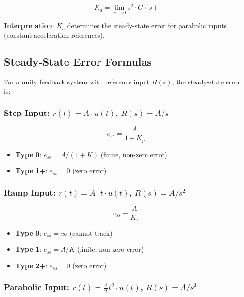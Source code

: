 \begin{equation}
    K_a = \lim_{s \to 0} s^2 \cdot G(s)
\end{equation}

\textbf{Interpretation}: $K_a$ determines the steady-state error for parabolic inputs (constant acceleration references).

\subsection{Steady-State Error Formulas}

For a unity feedback system with reference input $R(s)$, the steady-state error is:

\subsubsection{Step Input: $r(t) = A \cdot u(t)$, $R(s) = A/s$}

\begin{equation}
    \boxed{e_{ss} = \frac{A}{1 + K_p}}
\end{equation}

\begin{itemize}
    \item \textbf{Type 0}: $e_{ss} = A/(1 + K)$ (finite, non-zero error)
    \item \textbf{Type 1+}: $e_{ss} = 0$ (zero error)
\end{itemize}

\subsubsection{Ramp Input: $r(t) = A \cdot t \cdot u(t)$, $R(s) = A/s^2$}

\begin{equation}
    \boxed{e_{ss} = \frac{A}{K_v}}
\end{equation}

\begin{itemize}
    \item \textbf{Type 0}: $e_{ss} = \infty$ (cannot track)
    \item \textbf{Type 1}: $e_{ss} = A/K$ (finite, non-zero error)
    \item \textbf{Type 2+}: $e_{ss} = 0$ (zero error)
\end{itemize}

\subsubsection{Parabolic Input: $r(t) = \frac{A}{2} t^2 \cdot u(t)$, $R(s) = A/s^3$}

